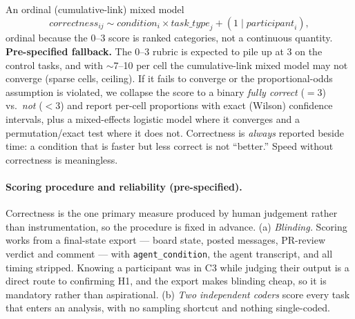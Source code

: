 \documentclass[11pt]{article}
\newcommand{\code}[1]{\texttt{#1}}
\begin{document}
An ordinal (cumulative-link) mixed model
\[
\textit{correctness}_{ij} \sim \textit{condition}_i \times \textit{task\_type}_j + (1\mid \textit{participant}_i),
\]
ordinal because the 0--3 score is ranked categories, not a continuous quantity.
\textbf{Pre-specified fallback.} The 0--3 rubric is expected to pile up at 3 on
the control tasks, and with $\sim$7--10 per cell the cumulative-link mixed model
may not converge (sparse cells, ceiling). If it fails to converge or the
proportional-odds assumption is violated, we collapse the score to a binary
\emph{fully correct} ($=3$) vs.\ \emph{not} ($<3$) and report per-cell
proportions with exact (Wilson) confidence intervals, plus a mixed-effects
logistic model where it converges and a permutation/exact test where it does not.
Correctness is \emph{always} reported beside time: a condition that is faster but
less correct is not ``better.'' Speed without correctness is meaningless.

\paragraph{Scoring procedure and reliability (pre-specified).} Correctness is the
one primary measure produced by human judgement rather than instrumentation, so
the procedure is fixed in advance. (a) \emph{Blinding.} Scoring works from a
final-state export --- board state, posted messages, PR-review verdict and
comment --- with \code{agent\_condition}, the agent transcript, and all timing
stripped. Knowing a participant was in C3 while judging their output is a direct
route to confirming H1, and the export makes blinding cheap, so it is mandatory
rather than aspirational. (b) \emph{Two independent coders} score every task that enters an analysis, with
no sampling shortcut and nothing single-coded.
\end{document}
